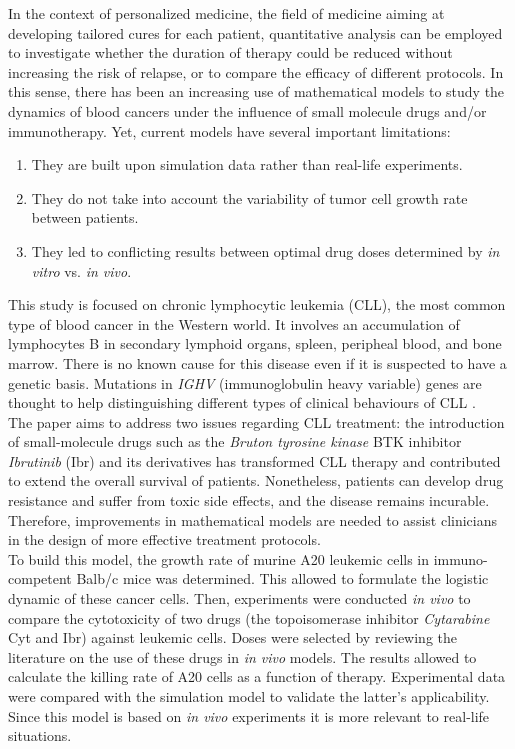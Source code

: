 In the context of personalized medicine, the field of medicine aiming at developing tailored cures for each patient,
quantitative analysis can be employed to investigate whether the duration of therapy could be reduced without increasing the risk of relapse, or to compare the efficacy of different protocols. 
In this sense, there has been an increasing use of mathematical models to study the dynamics of blood cancers under the influence of small molecule drugs and/or immunotherapy.
Yet, current models have several important limitations: 
\begin{enumerate}
	\item They are built upon simulation data rather than real-life experiments.
	\item They do not take into account the variability of tumor cell growth rate between patients.
	\item They led to conflicting results between optimal drug doses determined by \textit{in vitro} vs. \textit{in vivo}.
\end{enumerate}

This study is focused on chronic lymphocytic leukemia (CLL), the most common type of blood cancer in the Western world.
It involves an accumulation of lymphocytes B in secondary lymphoid organs, spleen, peripheal blood, and bone marrow.\cite{cll-burger-med, cll-rozman-med}  There is no known cause for this disease even if it is suspected to have a genetic basis. Mutations in \textit{IGHV} (immunoglobulin heavy variable) genes are thought to help distinguishing different types of clinical behaviours of CLL \cite{immunogl-med}.\\
The paper aims to address two issues regarding CLL treatment: the introduction of small-molecule drugs such as the \textit{Bruton tyrosine kinase} BTK inhibitor \textit{Ibrutinib} (Ibr) and its derivatives has transformed CLL therapy and contributed to extend the overall survival of patients.
Nonetheless, patients can develop drug resistance and suffer from toxic side effects, and the disease remains incurable. Therefore, improvements in mathematical models are needed to assist clinicians in the design of more effective treatment protocols.\\
To build this model, the growth rate of murine A20 leukemic cells in immuno-competent Balb/c mice was determined. This allowed to formulate the logistic dynamic of these cancer cells. 
Then, experiments were conducted \textit{in vivo} to compare the cytotoxicity of two drugs (the topoisomerase inhibitor \textit{Cytarabine} Cyt and Ibr) against leukemic cells. Doses were selected by reviewing the literature on the use of these drugs in \textit{in vivo} models. The results allowed to calculate the killing rate of A20 cells as a function of therapy. 
Experimental data were compared with the simulation model to validate the latter’s applicability. Since this model is based on \textit{in vivo} experiments it is more relevant to real-life situations.


